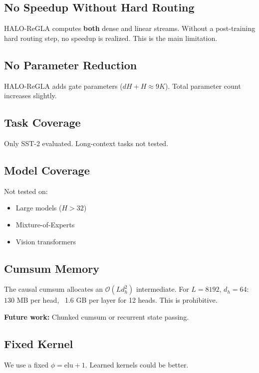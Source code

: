 \subsection{No Speedup Without Hard Routing}

HALO-ReGLA computes \textbf{both} dense and linear streams. Without a post-training 
hard routing step, no speedup is realized. This is the main limitation.

\subsection{No Parameter Reduction}

HALO-ReGLA adds gate parameters ($dH + H \approx 9K$). Total parameter count 
increases slightly.

\subsection{Task Coverage}

Only SST-2 evaluated. Long-context tasks not tested.

\subsection{Model Coverage}

Not tested on:
\begin{itemize}
\item Large models ($H > 32$)
\item Mixture-of-Experts
\item Vision transformers

\end{itemize}
\subsection{Cumsum Memory}

The causal cumsum allocates an $\mathcal{O}(L d_h^2)$ intermediate. For 
$L = 8192$, $d_h = 64$: ~$130$ MB per head, ~1.6 GB per layer for 12 heads. 
This is prohibitive.

\textbf{Future work:} Chunked cumsum or recurrent state passing.

\subsection{Fixed Kernel}

We use a fixed $\phi = \mathrm{elu} + 1$. Learned kernels could be better.

